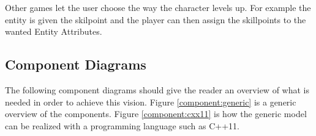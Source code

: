 Other games let the user choose the way the character levels up. For example
the entity is given the skilpoint and the player can then assign the
skillpoints to the wanted Entity Attributes.

\subsection{Component Diagrams}

The following component diagrams should give the reader an overview of what is
needed in order to achieve this vision. Figure \ref{component:generic} is a
generic overview of the components. Figure \ref{component:cxx11} is how the 
generic model can be realized with a programming language such as C++11.

%

